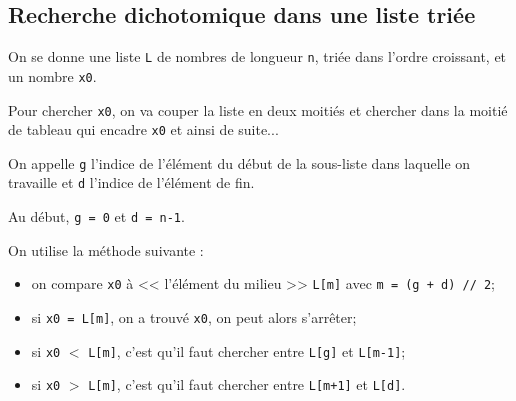 %
%
%


\subsection*{Recherche dichotomique dans une liste triée}

On se donne une liste \lstinline{L} de nombres de longueur \lstinline{n}, {triée dans l'ordre croissant}, et un nombre \lstinline{x0}. 

Pour chercher \lstinline{x0}, on va couper la liste en deux moitiés et chercher dans la moitié de tableau qui encadre \lstinline{x0} et ainsi de suite...

On appelle \lstinline{g} l'indice de l'élément du début de la sous-liste dans laquelle on travaille et \lstinline{d} l'indice de l'élément de fin.

Au début, \lstinline{g = 0} et \lstinline{d = n-1}.

%

On utilise la méthode suivante :
\begin{itemize}
\item on compare \lstinline{x0} à << l'élément du milieu >>  \lstinline{L[m]} avec \lstinline{m = (g + d) // 2};
\item si \lstinline{x0 = L[m]}, on a trouvé \lstinline{x0}, on peut alors s'arrêter;
\item si \lstinline{x0} $<$ \lstinline{L[m]}, c'est qu'il faut chercher entre \lstinline{L[g]} et  \lstinline{L[m-1]};%
\item si \lstinline{x0} $>$ \lstinline{L[m]}, c'est qu'il faut chercher  entre \lstinline{L[m+1]} et \lstinline{L[d]}.%
\end{itemize}

